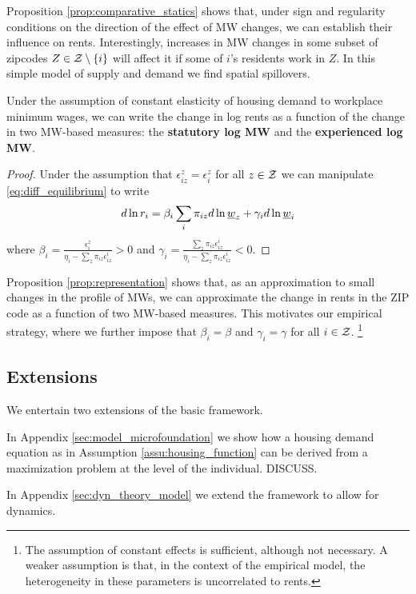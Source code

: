 Proposition \ref{prop:comparative_statics} shows that, under sign and regularity 
conditions on the direction of the effect of MW changes, we can establish their influence 
on rents. 
Interestingly, increases in MW changes in some subset of zipcodes $Z\in\mathcal{Z}\setminus\{i\}$ 
will affect it if some of $i$'s residents work in $Z$. 
In this simple model of supply and demand we find spatial spillovers.

\begin{prop}[Representation]\label{prop:representation}
	Under the assumption of constant elasticity of housing demand to workplace minimum 
	wages, we can write the change in log rents as a function of the change in two 
	MW-based measures: the \textbf{statutory log MW} and the \textbf{experienced log MW}.
\end{prop}

\begin{proof}
	Under the assumption that $\epsilon_{iz}^z = \epsilon_i^z$ for all $z\in\mathcal{Z}$ we can 
	manipulate \eqref{eq:diff_equilibrium} to write
	$$
	d \ln r_i = \beta_i \sum_i \pi_{iz} d\ln \underline{w}_z + \gamma_i d \ln \underline{w}_i
	$$
	where $\beta_i = \frac{\epsilon_{i}^z}{\eta_{i} - \sum_z \pi_{iz} \epsilon_{iz}^i} 
	>0$ and $\gamma_i = \frac{\sum_z \pi_{iz} \epsilon_{iz}^i}{\eta_{i} - \sum_z \pi_{iz} 
	\epsilon_{iz}^i} < 0$.
\end{proof}

Proposition \ref{prop:representation} shows that, as an approximation to small changes in 
the profile of MWs, we can approximate the change in rents in the ZIP code as a function 
of two MW-based measures.
This motivates our empirical strategy, where we further impose that $\beta_i = \beta$ and 
$\gamma_i=\gamma$ for all $i\in\mathcal{Z}$.%
\footnote{The assumption of constant effects is sufficient, although not necessary. A 
weaker assumption is that, in the context of the empirical model, the heterogeneity in 
these parameters is uncorrelated to rents.}

\subsection{Extensions}

We entertain two extensions of the basic framework.

In Appendix \ref{sec:model_microfoundation} we show how a housing demand equation as in 
Assumption \ref{assu:housing_function} can be derived from a maximization problem at the 
level of the individual. DISCUSS.

In Appendix \ref{sec:dyn_theory_model} we extend the framework to allow for dynamics.

